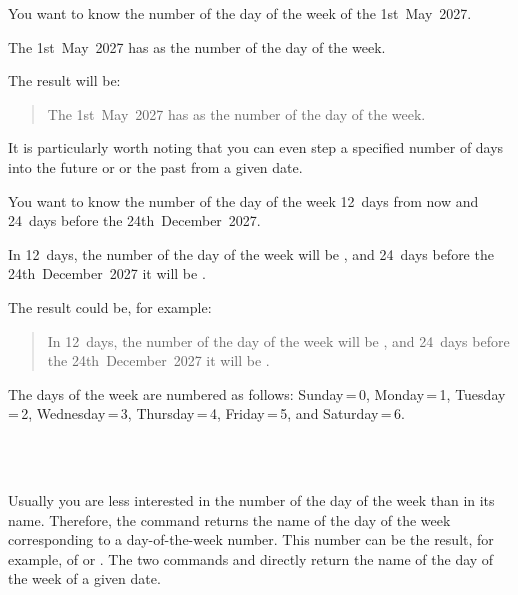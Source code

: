 \begin{Example}
  You want to know the number of the day of the week of the 1st~May~2027.
\begin{lstcode}
  The 1st~May~2027 has \the{}
  as the number of the day of the week.
\end{lstcode}
  The result will be:
  \begin{quote}
    The 1st~May~2027 has \the{}
    as the number of the day of the week.
  \end{quote}
\end{Example}

It is particularly worth noting that you can even step a specified number of
days into the future or or the past from a given date.
\begin{Example}
  You want to know the number of the day of the week 12~days from now
  and 24~days before the 24th~December~2027.
\begin{lstcode}
  In 12~days, the number of the day of the week
  will be \the{}, and
  24~days before the 24th~December~2027 it will be
  \the{}.
\end{lstcode}
  The result could be, for example:
  \begin{quote}
    In 12~days, the number of the day of the week
    will be \the{}, and
    24~days before the 24th~December~2027 it will be
    \the{}.
  \end{quote}
\end{Example}

The days of the week are numbered as follows: Sunday\,=\,0, Monday\,=\,1,
Tuesday\,=\,2, Wednesday\,=\,3, Thursday\,=\,4, Friday\,=\,5, and
Saturday\,=\,6.%
%
\EndIndexGroup


\begin{Declaration}
  \\%
  \\%
\end{Declaration}%
Usually you are less interested in the
number of the day of the week than in its name. Therefore, the
 command returns the name of the day of the week
corresponding to a day-of-the-week number. This number can be the result, for
example, of  or . The two commands
 and  directly return the name of the day of
the week of a given date.

